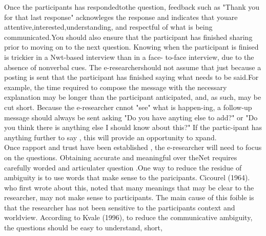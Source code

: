\documentclass[10pt]{book}
\begin{document}
\vspace{3mm}
Once the participants has respondedtothe question, feedback such as "Thank you for that last response" acknowleges the response and indicates that youare attentive,interested,understanding, and respectful of what is being communicated.You should also ensure that the participant has finished sharing prior to moving on to the next question. Knowing when the participant is finised is trickier in a Nwt-based interview than in a face- to-face interview, due to the absence of nonverbal cues. The e-researchershould not assume that just because a posting is sent that the participant has finished saying what needs to be said.For example, the time required to compose the message with the necessary explanation may be longer than the participant anticipated, and, as such, may be cut short. Because the e-researcher cnnot "see" what is happen-ing, a follow-up message should always be sent asking "Do you have anyting else to add?" or "Do you think there is anything else I should know about this?" If the partic-ipant has anything further to say , this will provide an opportunity to xpand.\\
Once rapport and trust have been established , the e-researcher will need to focus on the questions. Obtaining accurate and meaningful over theNet requires carefully worded and articulater question .One way to reduce the residue of ambiguity is to use words that make sense to the paricipants. Cicourel (1964). who first wrote about this, noted that many meanings that may be clear to the researcher, may not make sense to participants. The main cause of this foible is that the researcher has not been sensitive to the participants context and worldview. According to Kvale (1996), to reduce the communicative ambiguity, the questions should be easy to understand, short,
\end{document}
